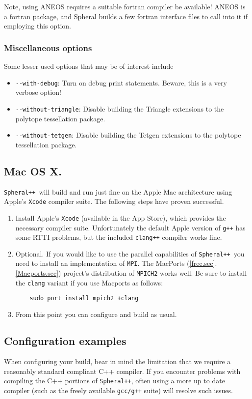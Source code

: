 \documentclass{article}
\newcommand{\Spheral}{{\tt Spheral++}}
\begin{document}
Note, using ANEOS requires a suitable fortran compiler be available!  ANEOS is a
fortran package, and Spheral builds a few fortran interface files to call into
it if employing this option.

\subsubsection{Miscellaneous options}
Some lesser used options that may be of interest include
\begin{itemize}
\item \verb+--with-debug+: Turn on debug print statements.  Beware, this is a
very verbose option!
\item \verb+--without-triangle+: Disable building the Triangle extensions to the
  polytope tessellation package.
\item \verb+--without-tetgen+: Disable building the Tetgen extensions to the
  polytope tessellation package.
\end{itemize}

\subsection{Mac OS X.}
\Spheral\ will build and run just fine on the Apple Mac architecture using
Apple's \verb+Xcode+ compiler suite.  The following steps have proven
successful.
\begin{enumerate}
\item Install Apple's \verb+Xcode+ (available in the App Store), which provides
  the necessary compiler suite.  Unfortunately the default Apple version of
  \verb.g++. has some RTTI problems, but the included \verb.clang++. compiler
  works fine.
\item Optional.  If you would like to use the parallel capabilities of
  \Spheral\ you need to install an implementation of \verb.MPI..  The MacPorts
  (\ref{free.sec}.\ref{Macports.sec}) project's distribution of
  \verb.MPICH2. works well.  Be sure to install the \verb.clang. variant if you
  use Macports as follows:
\begin{verbatim}
    sudo port install mpich2 +clang
\end{verbatim}
\item From this point you can configure and build as usual.
\end{enumerate}

\subsection{Configuration examples}
When configuring your build, bear in mind the limitation that we require a
reasonably standard compliant C++ compiler.  If you encounter problems with
compiling the C++ portions of \Spheral, often using a more up to date compiler
(such as the freely available \verb.gcc/g++. suite) will resolve such issues.
\end{document}
